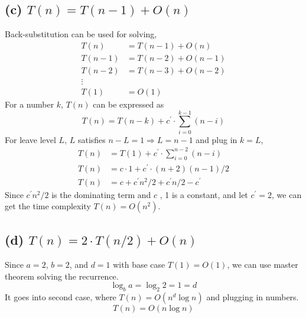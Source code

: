 \documentclass{article}
\begin{document}
\subsection*{(c) $T(n) = T(n-1) + O(n)$}
Back-substitution can be used for solving,
    \begin{align}
        T(n) & = T(n-1) + O(n) \nonumber \\
        T(n-1) & = T(n-2) + O(n-1) \nonumber \\
        T(n-2) & = T(n-3) + O(n-2) \nonumber \\
        \vdots \nonumber \\
        T(1) &= O(1) \nonumber
    \end{align}
For a number $k$, $T(n)$ can be expressed as 
$$T(n) = T(n-k) + c^\prime \cdot \sum_{i=0}^{k-1}(n-i)$$
For leave level $L$, $L$ satisfies $n-L = 1 \Rightarrow L = n-1$ and plug in $k = L$,
    \begin{align}
        T(n) &= T(1) + c^\prime  \cdot \sum_{i=0}^{n-2}(n-i) \nonumber \\
        T(n) &= c \cdot 1 + c^\prime \cdot (n+2)(n-1)/2 \nonumber \\
        T(n) &= c + c^\prime n^2 / 2 + c^\prime n/2 - c^\prime \nonumber 
    \end{align}
Since $c^\prime n^2 / 2$ is the dominating term and $c$ , 1 is a constant, and let $c^\prime  = 2$, we can get the time complexity $T(n) = O(n^2)$.
\subsection*{(d) $T(n) = 2\cdot T(n/2) + O(n)$}
Since $a = 2$, $b = 2$, and $d = 1$ with base case $T(1) = O(1)$, we can use master theorem solving the recurrence.
$$\log_b a = \log_2 2 = 1 = d$$
It goes into second case, where $T(n) = O(n^d\log n)$ and plugging in numbers.
$$T(n) = O(n\log n)$$
\end{document}
